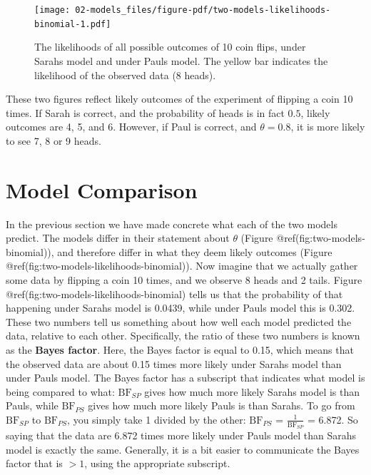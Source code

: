 \documentclass[
  letterpaper,
  DIV=11,
  numbers=noendperiod]{scrreprt}
\begin{document}
\begin{figure}

{\centering \texttt{[image: 02-models\_files/figure-pdf/two-models-likelihoods-binomial-1.pdf]}

}

\caption{The likelihoods of all possible outcomes of 10 coin flips,
under Sarahs model and under Pauls model. The yellow bar indicates the
likelihood of the observed data (8 heads).}

\end{figure}

These two figures reflect likely outcomes of the experiment of flipping
a coin 10 times. If Sarah is correct, and the probability of heads is in
fact \(0.5\), likely outcomes are 4, 5, and 6. However, if Paul is
correct, and \(\theta = 0.8\), it is more likely to see 7, 8 or 9 heads.

\hypertarget{model-comparison-section}{%
\section{Model Comparison}\label{model-comparison-section}}

In the previous section we have made concrete what each of the two
models predict. The models differ in their statement about \(\theta\)
(Figure @ref(fig:two-models-binomial)), and therefore differ in what
they deem likely outcomes (Figure
@ref(fig:two-models-likelihoods-binomial)). Now imagine that we actually
gather some data by flipping a coin 10 times, and we observe 8 heads and
2 tails. Figure @ref(fig:two-models-likelihoods-binomial) tells us that
the probability of that happening under Sarahs model is 0.0439, while
under Pauls model this is 0.302. These two numbers tell us something
about how well each model predicted the data, relative to each other.
Specifically, the ratio of these two numbers is known as the
\textbf{Bayes factor}. Here, the Bayes factor is equal to 0.15, which
means that the observed data are about 0.15 times more likely under
Sarahs model than under Pauls model. The Bayes factor has a subscript
that indicates what model is being compared to what: \(\text{BF}_{SP}\)
gives how much more likely Sarahs model is than Pauls, while
\(\text{BF}_{PS}\) gives how much more likely Pauls is than Sarahs. To
go from \(\text{BF}_{SP}\) to \(\text{BF}_{PS}\), you simply take 1
divided by the other: \(\text{BF}_{PS}\) = \(\frac{1}{\text{BF}_{SP}}\)
= 6.872. So saying that the data are 6.872 times more likely under Pauls
model than Sarahs model is exactly the same. Generally, it is a bit
easier to communicate the Bayes factor that is \(>1\), using the
appropriate subscript.
\end{document}
